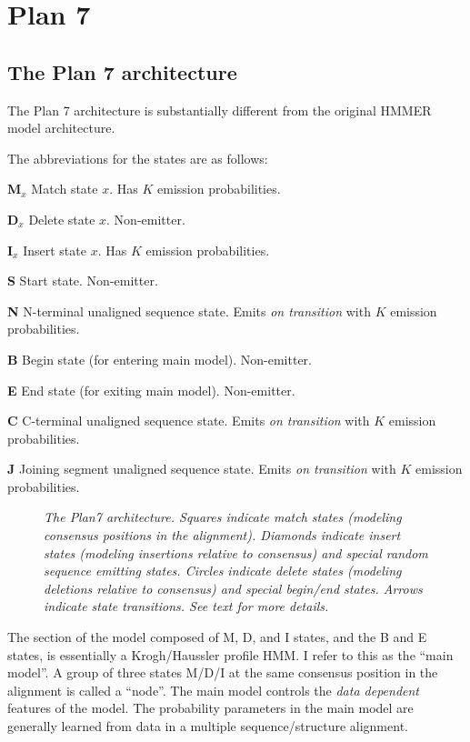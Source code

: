 \section{Plan 7}

\subsection{The Plan 7 architecture}

The Plan 7 architecture is substantially different from the original
HMMER model architecture. 

The abbreviations for the states are as follows:

\begin{wideitem}
\item [\textbf{M$_x$}] Match state $x$.  Has $K$ emission probabilities.
\item [\textbf{D$_x$}] Delete state $x$. Non-emitter.
\item [\textbf{I$_x$}] Insert state $x$. Has $K$ emission probabilities.
\item [\textbf{S}]     Start state. Non-emitter.
\item [\textbf{N}]     N-terminal unaligned sequence state. 
    Emits \textit{on transition} with $K$ emission probabilities.
\item [\textbf{B}]     Begin state (for entering main model). Non-emitter.
\item [\textbf{E}]     End state (for exiting main model). Non-emitter.
\item [\textbf{C}]     C-terminal unaligned sequence state.
    Emits \textit{on transition} with $K$ emission probabilities.
\item [\textbf{J}]     Joining segment unaligned sequence state.
    Emits \textit{on transition} with $K$ emission probabilities.
\end{wideitem}

\begin{figure}
\caption{\textit{The Plan7 architecture. Squares indicate match states
(modeling consensus positions in the alignment). Diamonds indicate
insert states (modeling insertions relative to consensus) and special
random sequence emitting states. Circles indicate delete states
(modeling deletions relative to consensus) and special begin/end
states. Arrows indicate state transitions. See text for more details.}}
\end{figure}

The section of the model composed of M, D, and I states, and the B and
E states, is essentially a Krogh/Haussler profile HMM. I refer to this
as the ``main model''. A group of three states M/D/I at the same
consensus position in the alignment is called a ``node''. The main
model controls the \textit{data dependent} features of the model.  The
probability parameters in the main model are generally learned from
data in a multiple sequence/structure alignment.

